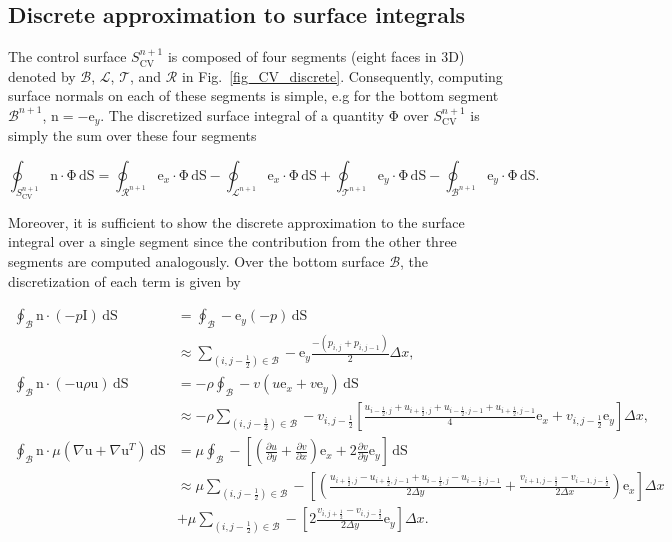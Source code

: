 \documentclass[review]{elsarticle}
\newcommand \D [2]{\frac{\partial #1}{\partial #2}}
\renewcommand{\vec}[1]{\bm{\mathrm{#1}}}
\def \grad{\nabla}
\def \n{\vec{n}}
\def \u{\vec{u}}
\def \e{\vec{e}}
\def \I{\vec{I}}
\def  \Scv{S_\text{CV}}
\def \I{\vec{I}}
\def \cB{\mathcal{B}}
\def \cR{{\mathcal{R}}}
\def \cL{{\mathcal{L}}}
\def \cT{\mathcal{T}}
\def \e{\vec{e}}
\def \half{\frac{1}{2}}
\def \3half{\frac{3}{2}}
\def \n{\vec{n}}
\def \u{\vec{u}}
\def \grad{\nabla}
\def \dx{\Delta x}
\def \dy{\Delta y}
\def \dS{\,\mathrm{dS}}
\def \dx{\Delta x}
\def \ndot{\n \cdot}
\begin{document}
\subsection{Discrete approximation to surface integrals}
The control surface $\Scv^{n+1}$ is composed of four segments (eight
faces in $3$D) denoted by $\cB$, $\cL$, $\cT$, and $\cR$ in Fig.~\ref{fig_CV_discrete}. 
Consequently, computing surface normals on each of these segments is simple, 
e.g for the bottom segment $\cB^{n+1}$, $\n = -\e_y$. The discretized surface 
integral of a quantity $\vec{\Phi}$ over $\Scv^{n+1}$ is simply the sum over these 
four segments

\begin{equation}
\label{eq_discrete_oint_CV}
\oint_{\Scv^{n+1}} \ndot \vec{\Phi} \dS =
\oint_{\cR^{n+1}} \e_x \cdot \vec{\Phi} \dS
- \oint_{\cL^{n+1}} \e_x \cdot \vec{\Phi} \dS
+ \oint_{\cT^{n+1}} \e_y \cdot \vec{\Phi} \dS
- \oint_{\cB^{n+1}} \e_y \cdot \vec{\Phi} \dS.
\end{equation}

Moreover, it is sufficient to show the discrete approximation to the surface
integral over a single segment since the contribution from the other three
segments are computed analogously. Over the bottom surface $\cB$, the
discretization of each term is given by

\begin{align}
\oint_{\cB} \ndot \left(-p \I\right) \dS  & = \oint_{\cB} - \e_y \left(-p\right)\dS  \nonumber \\
		  & \approx \sum_{(i,j-\half)\in \cB}  -\e_y \frac{-(p_{i,j} + p_{i,j-1})}{2} \dx,\label{eq_discrete_oint_B_p}  \\
\oint_{\cB} \ndot \left(- \u\rho \u\right) \dS   & = -\rho \oint_{\cB} -v \left(u \e_x + v \e_y \right) \dS  \nonumber \\  
								& \approx -\rho \sum_{(i,j-\half)\in \cB} -v_{i,j-\half}\left[\frac{u_{i-\half,j}+u_{i+\half,j}+u_{i-\half,j-1}+u_{i+\half,j-1}}{4}\e_x+v_{i,j-\half}\e_y\right] \dx  \label{eq_discrete_oint_B_u}, \\
 \oint_{\cB} \ndot \mu\left(\grad \u + \grad \u^T\right) \dS  & = \mu \oint_{\cB}  -\left[\left(\D{u}{y} + \D{v}{x} \right)\e_x + 2 \D{v}{y}\e_y \right] \dS  \nonumber \\
				& \approx \mu \sum_{(i,j-\half)\in \cB}  - \left[\left(\frac{u_{i+\half,j} - u_{i+\half,j-1} + u_{i-\half,j} - u_{i-\half,j-1}}{2\dy} + \frac{v_{i+1,j-\half} - v_{i-1,j-\half} }{2 \dx}\right)\e_x \right] \dx \nonumber \\
& + \mu \sum_{(i,j-\half)\in \cB} - \left[ 2 \frac{v_{i,j+\half} - v_{i,j-\3half}}{2 \dy}\e_y \right]\dx\label{eq_discrete_oint_B_visc}.
\end{align}
\end{document}

